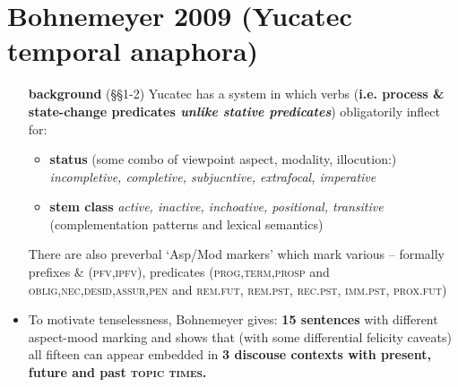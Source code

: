 \documentclass[10pt]{article}
\begin{document}
\section{Bohnemeyer 2009 (Yucatec temporal anaphora)}
\begin{itemize}
	\item[\textbf{background} (§§1-2)] Yucatec has a system in which verbs (\textbf{i.e. process \& state-change predicates \textit{unlike stative predicates}}) obligatorily inflect for:
	\begin{itemize}
		\item \textbf{status} (some combo of viewpoint aspect, modality, illocution:) \textit{incompletive, completive, subjucntive, extrafocal, imperative}
		\item \textbf{stem class} \textit{active, inactive, inchoative, positional, transitive} (complementation patterns and lexical semantics)
	\end{itemize}
	There are also preverbal `Asp/Mod markers' which mark various -- formally prefixes \& (\textsc{pfv,ipfv}), predicates (\textsc{prog,term,prosp} and \textsc{oblig,nec,desid,assur,pen} and \textsc{rem.fut, rem.pst, rec.pst, imm.pst, prox.fut})\\
	
	
	
	\item To motivate tenselessness, Bohnemeyer gives: \textbf{15 sentences} with different aspect-mood marking and shows that (with some differential felicity caveats) all fifteen can appear embedded in \textbf{3 discouse contexts with present, future and past \textsc{topic times.}}
	

\end{itemize}
\end{document}
